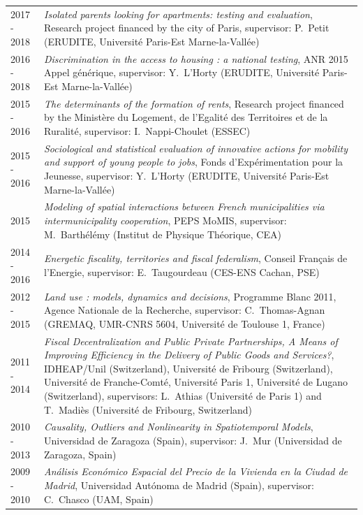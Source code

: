 \documentclass[a4paper,12pt]{article}
\begin{document}
\begin{longtable}{@{}p{\annee}p{\texte}@{}}
2017 - 2018 & \og{}\textit{Isolated parents looking for apartments: testing and evaluation}\fg{}, Research project financed by the city of Paris, supervisor: P.~Petit (ERUDITE, Université Paris-Est Marne-la-Vallée) \\
2016 - 2018 & \og{}\textit{Discrimination in the access to housing : a national testing}\fg{}, ANR 2015 Appel générique, supervisor: Y.~L'Horty (ERUDITE, Université Paris-Est Marne-la-Vallée) \\
2015 - 2016 & \og{}\textit{The determinants of the formation of rents}\fg{}, Research project financed by the Ministère du Logement, de l'Egalité des Territoires et de la Ruralité, supervisor: I.~Nappi-Choulet (ESSEC) \\
2015 - 2016 & \og{}\textit{Sociological and statistical evaluation of innovative actions for mobility and support of young people to jobs}\fg{}, Fonds d'Expérimentation pour la Jeunesse, supervisor: Y.~L'Horty (ERUDITE, Université Paris-Est Marne-la-Vallée) \\
2015		& \og{}\textit{Modeling of spatial interactions between French municipalities via intermunicipality cooperation}\fg{}, PEPS MoMIS, supervisor: M.~Barthélémy (Institut de Physique Théorique, CEA) \\
2014 - 2016 & \og{}\textit{Energetic fiscality, territories and fiscal federalism}\fg{}, Conseil Français de l'Energie, supervisor: E.~Taugourdeau (CES-ENS Cachan, PSE) \\
2012 - 2015 & \og{}\textit{Land use : models, dynamics and decisions}\fg{}, Programme Blanc 2011, Agence Nationale de la Recherche, supervisor: C.~Thomas-Agnan (GREMAQ, UMR-CNRS 5604, Université de Toulouse 1, France) \\
2011 - 2014 & \og{}\textit{Fiscal Decentralization and Public Private Partnerships, A Means of Improving Efficiency in the Delivery of Public Goods and Services?}\fg{}, IDHEAP/Unil (Switzerland), Université de Fribourg (Switzerland), Université de Franche-Comté, Université Paris 1, Université de Lugano (Switzerland), supervisors: L.~Athias (Université de Paris 1) and T.~Madiès (Université de Fribourg, Switzerland)\\
2010 - 2013 & \og{}\textit{Causality, Outliers and Nonlinearity in Spatiotemporal Models}\fg{}, Universidad de Zaragoza (Spain), supervisor: J.~Mur (Universidad de Zaragoza, Spain)\\
2009 - 2010 & \og{}\textit{Análisis Económico Espacial del Precio de la Vivienda en la Ciudad de Madrid}\fg{}, Universidad Autónoma de Madrid (Spain), supervisor: C.~Chasco (UAM, Spain)\\

\end{longtable}
\end{document}

